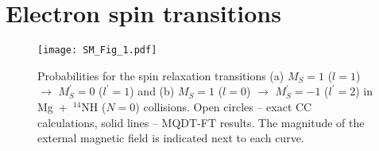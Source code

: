 \documentclass[reprint,amssymb,noeprint,twocolumn,longbibliography]{revtex4-2}
\begin{document}

\vspace{0.2cm}
\section{\label{sec:SM_SR} Electron spin transitions}

\begin{figure}[t!]
\begin{center}
\texttt{[image: SM\_Fig\_1.pdf]}
\end{center}
\caption{Probabilities for the spin relaxation transitions (a) $M_S=1$ ($l=1$) $\to$ $M^\prime_S=0$ ($l^\prime=1$) and (b) $M_S=1$ ($l=0$) $\to$ $M^\prime_S=-1$ ($l^\prime=2$) in Mg~+~$^{14}$NH ($N=0$) collisions. Open circles --  exact CC calculations, solid lines -- MQDT-FT results. The magnitude of the external magnetic field is indicated next to each curve. 
}
\label{SM_Fig_1}
\end{figure}
\end{document}
